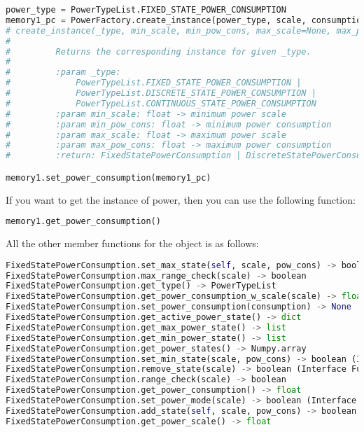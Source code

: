 \documentclass[]{scrartcl}
\begin{document}
\begin{lstlisting}[language=Python, frame=single, label={lst:memory1settingPowerConsumption}, caption={Initializing power consumption module and setting it to the resource.}]
power_type = PowerTypeList.FIXED_STATE_POWER_CONSUMPTION
memory1_pc = PowerFactory.create_instance(power_type, scale, consumption)
# create_instance(_type, min_scale, min_pow_cons, max_scale=None, max_pow_cons=None) -> FixedStatePowerConsumption | DiscreteStatePowerConsumption | ContinuousStatePowerConsumption
# 
#         Returns the corresponding instance for given _type.
# 
#         :param _type:
#             PowerTypeList.FIXED_STATE_POWER_CONSUMPTION |
#             PowerTypeList.DISCRETE_STATE_POWER_CONSUMPTION |
#             PowerTypeList.CONTINUOUS_STATE_POWER_CONSUMPTION
#         :param min_scale: float -> minimum power scale
#         :param min_pow_cons: float -> minimum power consumption
#         :param max_scale: float -> maximum power scale
#         :param max_pow_cons: float -> maximum power consumption
#         :return: FixedStatePowerConsumption | DiscreteStatePowerConsumption | ContinuousStatePowerConsumption

memory1.set_power_consumption(memory1_pc)
\end{lstlisting}
        

If you want to get the instance of power, then you can use the following function:

\begin{lstlisting}[language=Python, frame=single, label={lst:memory1gettingPowerConsumption}, caption={Getting power consumption module}]
memory1.get_power_consumption()
\end{lstlisting}
        
            
All the other member functions for the object is as follows:
            

\begin{lstlisting}[language=Python, frame=single, label={lst:memory1memberFunctionsPower}, caption={The member functions for \textsf{FixedStatePowerConsumption} module.}]
FixedStatePowerConsumption.set_max_state(self, scale, pow_cons) -> boolean (Interface Function)
FixedStatePowerConsumption.max_range_check(scale) -> boolean
FixedStatePowerConsumption.get_type() -> PowerTypeList
FixedStatePowerConsumption.get_power_consumption_w_scale(scale) -> float (Interface Function)
FixedStatePowerConsumption.set_power_consumption(consumption) -> None
FixedStatePowerConsumption.get_active_power_state() -> dict
FixedStatePowerConsumption.get_max_power_state() -> list
FixedStatePowerConsumption.get_min_power_state() -> list
FixedStatePowerConsumption.get_power_states() -> Numpy.array
FixedStatePowerConsumption.set_min_state(scale, pow_cons) -> boolean (Interface Function)
FixedStatePowerConsumption.remove_state(scale) -> boolean (Interface Function)
FixedStatePowerConsumption.range_check(scale) -> boolean
FixedStatePowerConsumption.get_power_consumption() -> float
FixedStatePowerConsumption.set_power_mode(scale) -> boolean (Interface Function)
FixedStatePowerConsumption.add_state(self, scale, pow_cons) -> boolean (Interface Function)
FixedStatePowerConsumption.get_power_scale() -> float
\end{lstlisting}
        
\end{document}
